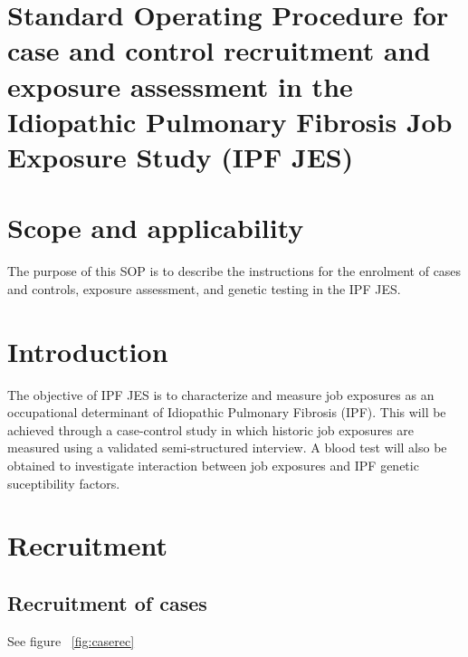 \documentclass[a4paper,10pt]{article}
\begin{document}
 
 
 \pagestyle{fancy}
 
 


\section*{Standard Operating Procedure for case and control recruitment and exposure assessment in the Idiopathic Pulmonary Fibrosis Job Exposure Study (IPF JES)}

\tableofcontents

\section{Scope and applicability}

The purpose of this SOP is to describe the instructions for the enrolment of cases and controls, exposure assessment, and genetic testing in the IPF JES.

\section{Introduction}

The objective of IPF JES is to characterize and measure job exposures as an occupational determinant of Idiopathic Pulmonary Fibrosis (IPF). This will be achieved through a case-control study in which historic job exposures are measured using a validated semi-structured interview. A blood test will also be obtained to investigate interaction between job exposures and IPF genetic suceptibility factors.   

\section{Recruitment}

\subsection{Recruitment of cases}

See figure ~\ref{fig:caserec}
\end{document}
